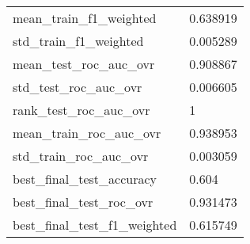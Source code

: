 \begin{tabular}{ll}
mean\_train\_f1\_weighted        &                                           0.638919 \\
std\_train\_f1\_weighted         &                                           0.005289 \\
mean\_test\_roc\_auc\_ovr         &                                           0.908867 \\
std\_test\_roc\_auc\_ovr          &                                           0.006605 \\
rank\_test\_roc\_auc\_ovr         &                                                  1 \\
mean\_train\_roc\_auc\_ovr        &                                           0.938953 \\
std\_train\_roc\_auc\_ovr         &                                           0.003059 \\
best\_final\_test\_accuracy      &                                              0.604 \\
best\_final\_test\_roc\_ovr       &                                           0.931473 \\
best\_final\_test\_f1\_weighted   &                                           0.615749 \\
\bottomrule
\end{tabular}
